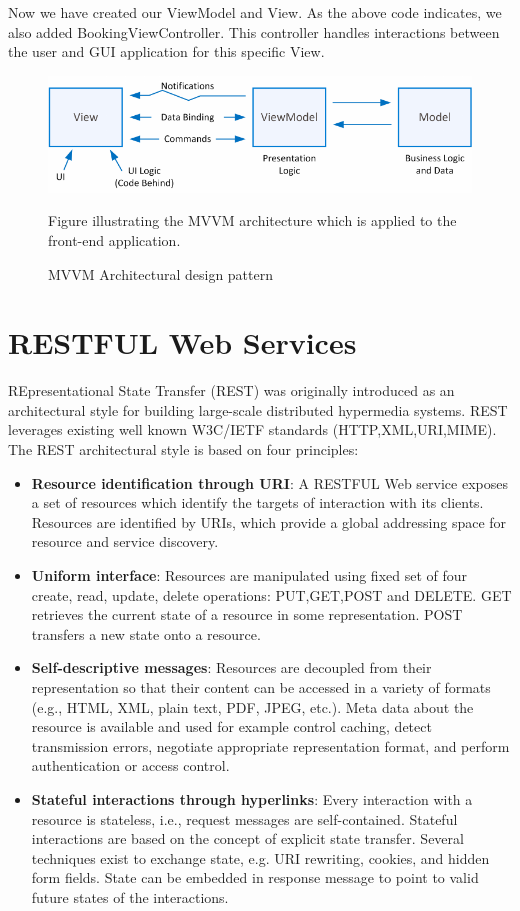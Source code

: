 Now we have created our ViewModel and View. As the above code indicates, we also added BookingViewController. This controller handles interactions between the user and GUI application for this specific View.


\begin{figure} 
\centering
\includegraphics[width=12cm]{pictures/MVVM_arch_pattern.png}
\caption{MVVM Architectural design pattern}
Figure illustrating the MVVM architecture which is applied to the front-end application.
\label{fig:mvvm_pic_lbl}
\end{figure}




\section{RESTFUL Web Services}
\label{sec:restful_sec}
REpresentational State Transfer (REST) was originally introduced as an architectural style for building large-scale distributed hypermedia systems. REST leverages existing well known W3C/IETF standards (HTTP,XML,URI,MIME).\cite{rest_service}
The REST architectural style is based on four principles: \cite{rest_service}
\begin{itemize}
\item \textbf{Resource identification through URI}: A RESTFUL Web service exposes a set of resources which identify the targets of interaction with its clients. Resources are identified by URIs, which provide a global addressing space for resource and service discovery.
\item \textbf{Uniform interface}: Resources are manipulated using fixed set of four create, read, update, delete operations: PUT,GET,POST and DELETE. GET retrieves the current state of a resource in some representation. POST transfers a new state onto a resource.
\item \textbf{Self-descriptive messages}:
Resources are decoupled from their representation so that their content can be accessed in a variety of formats (e.g., HTML, XML, plain text, PDF, JPEG, etc.). Meta data about the resource is available and used for example control caching, detect transmission errors, negotiate appropriate representation format, and perform authentication or access control.
\item \textbf{Stateful interactions through hyperlinks}: 
Every interaction with a resource is stateless, i.e., request messages are self-contained. Stateful interactions are based on the concept of explicit state transfer. Several techniques exist to exchange state, e.g. URI rewriting, cookies, and hidden form fields. State can be embedded in response message to point to valid future states of the interactions. 
\end{itemize}

